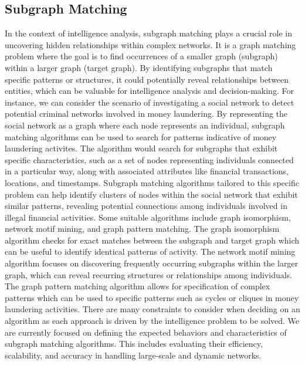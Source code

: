 \documentclass[letterpaper, 10pt]{article}
\begin{document}
\begin{multicols}{2}
        \subsection{Subgraph Matching}\label{section:subgraphMatching}
            In the context of intelligence analysis, subgraph matching plays a crucial role in uncovering hidden relationships within complex networks. It is a graph matching problem where the goal is to find occurrences of a smaller graph (subgraph) within a larger graph (target graph). By identifying subgraphs that match specific patterns or structures, it could potentially reveal relationships between entities, which can be valuable for intelligence analysis and decision-making. For instance, we can consider the scenario of investigating a social network to detect potential criminal networks involved in money laundering. By representing the social network as a graph where each node represents an individual, subgraph matching algorithms can be used to search for patterns indicative of money laundering activites. The algorithm would search for subgraphs that exhibit specific characteristics, such as a set of nodes representing individuals connected in a particular way, along with associated attributes like financial transactions, locations, and timestamps. Subgraph matching algorithms tailored to this specific problem can help identify clusters of nodes within the social network that exhibit similar patterns, revealing potential connections among individuals involved in illegal financial activities. Some suitable algorithms include graph isomorphism, network motif mining, and graph pattern matching. The graph isomorphism algorithm checks for exact matches between the subgraph and target graph which can be useful to identify identical patterns of activity. The network motif mining algorithm focuses on discovering frequently occurring subgraphs within the larger graph, which can reveal recurring structures or relationships among individuals. The graph pattern matching algorithm allows for specification of complex patterns which can be used to specific patterns such as cycles or cliques in money laundering activities. There are many constraints to consider when deciding on an algorithm as each approach is driven by the intelligence problem to be solved. 
            We are currently focused on defining the expected behaviors and characteristics of subgraph matching algorithms. This includes evaluating their efficiency, scalability, and accuracy in handling large-scale and dynamic networks. 


\end{multicols}
\end{document}
